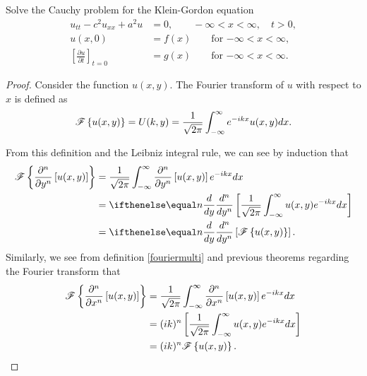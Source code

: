 \begin{problem}{2.10}
  Solve the Cauchy problem for the Klein-Gordon equation
  \begin{align*}
    u_{tt} - c^2 u_{xx} + a^2 u &= 0, \qquad -\infty < x < \infty, \quad t > 0, \\
    u(x, 0) &= f(x) \qquad \text{for $-\infty < x < \infty,$} \\
    \left[\frac{\partial u}{\partial t}\right]_{t=0} &= g(x) \qquad \text{for $-\infty < x < \infty$}.
  \end{align*}
\end{problem}

\begin{proof}
  Consider the function $u(x, y)$. The Fourier transform
  of $u$ with respect to $x$ is defined as
  \begin{align}\label{fouriermulti}
    \mathscr{F}\left\{ {u(x, y)} \right\} = U(k, y) = \frac{1}{\sqrt{2\pi}}\int_{-\infty}^{\infty} e^{-ikx} u(x, y) dx.
  \end{align}

  From this definition and the Leibniz integral rule, we can see by induction that
  \begin{align}\label{partialy}
    \fourier{\frac{\partial^n }{\partial y^n }\left[u(x,y)\right]}
    &= \frac{1}{\sqrt{2\pi}}\int_{-\infty}^\infty \frac{\partial^n}{ \partial y^n}\left[ u(x, y)\right] e^{-ikx} dx \notag \\
    &= \der{y}{n}\left[\frac{1}{\sqrt{2\pi}} \int_{-\infty}^\infty u(x, y) e^{-ikx} dx \right] \notag \\
    &= \der{y}{n}\left[\fourier{u(x,y)}\right].
  \end{align}
  Similarly, we see from definition \eqref{fouriermulti} and previous
  theorems regarding the Fourier transform that
  \begin{align}\label{partialx}
    \mathscr{F}\left\{ {\frac{\partial^n}{\partial x^n}\left[u(x, y)\right]} \right\}
    &= \frac{1}{\sqrt{2\pi}}\int_{-\infty}^\infty \frac{\partial^n}{\partial x^n}\left[u(x, y)\right] e^{-ikx} dx \notag \\
    &= (ik)^n \left[\frac{1}{\sqrt{2\pi}} \int_{-\infty}^\infty u(x,y)e^{-ikx} dx \right] \notag \\
    &= (ik)^n \mathscr{F}\left\{ {u(x,y)} \right\}.
  \end{align}


\end{proof}
